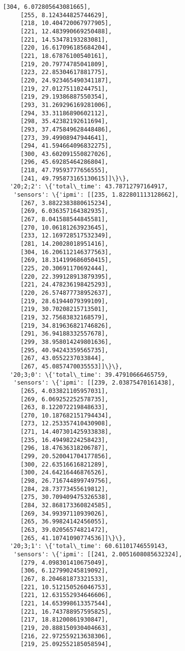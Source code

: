 \documentclass[11pt]{article}
\begin{document}
\begin{tcolorbox}[breakable, size=fbox, boxrule=.5pt, pad at break*=1mm, opacityfill=0]
\begin{Verbatim}[commandchars=\\\{\}]
     [304, 6.072805643081665],
     [255, 8.124344825744629],
     [218, 10.404720067977905],
     [221, 12.483990669250488],
     [221, 14.53478193283081],
     [220, 16.617096185684204],
     [221, 18.67876100540161],
     [219, 20.79774785041809],
     [223, 22.85304617881775],
     [220, 24.923465490341187],
     [219, 27.01275110244751],
     [219, 29.19386887550354],
     [293, 31.269296169281006],
     [294, 33.31186890602112],
     [298, 35.42382192611694],
     [293, 37.475849628448486],
     [273, 39.49908947944641],
     [294, 41.594664096832275],
     [300, 43.602091550827026],
     [296, 45.69285464286804],
     [218, 47.79593777656555],
     [241, 49.795873165130615]]\}\},
  '20;2;2': \{'total\_time': 43.78712797164917,
   'sensors': \{'ipmi': [[235, 1.822801113128662],
     [267, 3.8822383880615234],
     [269, 6.036357164382935],
     [267, 8.041588544845581],
     [270, 10.06181263923645],
     [233, 12.169728517532349],
     [281, 14.20028018951416],
     [304, 16.206112146377563],
     [269, 18.314199686050415],
     [225, 20.30691170692444],
     [220, 22.399128913879395],
     [221, 24.478236198425293],
     [220, 26.574877738952637],
     [219, 28.61944079399109],
     [219, 30.70208215713501],
     [219, 32.75683832168579],
     [219, 34.819636821746826],
     [291, 36.94188332557678],
     [299, 38.958014249801636],
     [295, 40.94243359565735],
     [267, 43.0552237033844],
     [267, 45.0857470035553]]\}\},
  '20;3;0': \{'total\_time': 39.47910666465759,
   'sensors': \{'ipmi': [[239, 2.03875470161438],
     [265, 4.033821105957031],
     [269, 6.069252252578735],
     [263, 8.122072219848633],
     [270, 10.187682151794434],
     [273, 12.253357410430908],
     [271, 14.407301425933838],
     [235, 16.49498224258423],
     [296, 18.47636318206787],
     [299, 20.520041704177856],
     [300, 22.63516616821289],
     [300, 24.64216446876526],
     [298, 26.716744899749756],
     [284, 28.73773455619812],
     [275, 30.709409475326538],
     [284, 32.868173360824585],
     [269, 34.99397110939026],
     [265, 36.99824142456055],
     [263, 39.02056574821472],
     [265, 41.10741090774536]]\}\},
  '20;3;1': \{'total\_time': 60.61101746559143,
   'sensors': \{'ipmi': [[241, 2.0051608085632324],
     [279, 4.098301410675049],
     [306, 6.127990245819092],
     [267, 8.204681873321533],
     [221, 10.512150526046753],
     [221, 12.631552934646606],
     [221, 14.653998613357544],
     [221, 16.743788957595825],
     [217, 18.81200861930847],
     [219, 20.888150930404663],
     [216, 22.972559213638306],
     [219, 25.092552185058594],

\end{Verbatim}
\end{tcolorbox}
\end{document}
